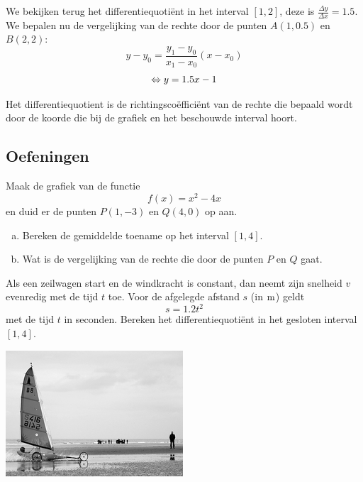 \documentclass[12pt]{article}
\begin{document}
We bekijken terug het differentiequotiënt in het interval $[1,2]$, deze is $\frac{\Delta y}{\Delta x}=1.5$. We bepalen nu de vergelijking van de rechte door de punten $A(1, 0.5)$ en $B(2,2)$:
$$y-y_0=\dfrac{y_1-y_0}{x_1-x_0}(x-x_0)$$
$$\Leftrightarrow y=1.5x-1$$

Het differentiequotient is de richtingscoëfficiënt van de rechte die bepaald wordt door de koorde die bij de grafiek en het beschouwde interval hoort.

\subsection{Oefeningen}

\begin{oefening}
Maak de grafiek van de functie
$$f(x)=x^2-4x$$
en duid er de punten $P(1,-3)$ en $Q(4,0)$ op aan.
\begin{enumerate}[(a)]
  \item Bereken de gemiddelde toename op het interval $[1,4]$.
  \item Wat is de vergelijking van de rechte die door de punten $P$ en $Q$ gaat.
\end{enumerate}
\end{oefening}

\begin{oefening}
Als een zeilwagen start en de windkracht is constant, dan neemt zijn snelheid $v$ evenredig met de tijd $t$ toe. Voor de afgelegde afstand $s$ (in $\m$) geldt
$$s=1.2t^2$$
met de tijd $t$ in seconden. Bereken het differentiequotiënt in het gesloten interval $[1,4]$.
\begin{center}
  \includegraphics{zeilwagen}
\end{center}
\end{oefening}
\end{document}
